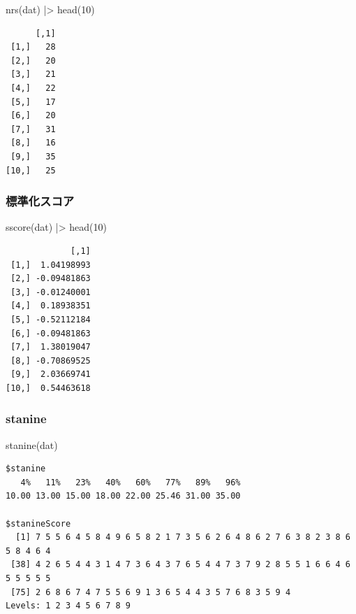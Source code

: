 \documentclass[
  a4paper,
]{ltjsbook}
\newenvironment{Shaded}{\begin{snugshade}}{\end{snugshade}}
\newcommand{\DecValTok}[1]{\textcolor[rgb]{0.68,0.00,0.00}{#1}}
\newcommand{\FunctionTok}[1]{\textcolor[rgb]{0.28,0.35,0.67}{#1}}
\newcommand{\NormalTok}[1]{\textcolor[rgb]{0.00,0.23,0.31}{#1}}
\newcommand{\SpecialCharTok}[1]{\textcolor[rgb]{0.37,0.37,0.37}{#1}}
\begin{document}
\begin{Shaded}
\begin{Highlighting}[]
\FunctionTok{nrs}\NormalTok{(dat) }\SpecialCharTok{|\textgreater{}} \FunctionTok{head}\NormalTok{(}\DecValTok{10}\NormalTok{)}
\end{Highlighting}
\end{Shaded}

\begin{verbatim}
      [,1]
 [1,]   28
 [2,]   20
 [3,]   21
 [4,]   22
 [5,]   17
 [6,]   20
 [7,]   31
 [8,]   16
 [9,]   35
[10,]   25
\end{verbatim}

\subsubsection{標準化スコア}\label{ux6a19ux6e96ux5316ux30b9ux30b3ux30a2}

\begin{Shaded}
\begin{Highlighting}[]
\FunctionTok{sscore}\NormalTok{(dat) }\SpecialCharTok{|\textgreater{}} \FunctionTok{head}\NormalTok{(}\DecValTok{10}\NormalTok{)}
\end{Highlighting}
\end{Shaded}

\begin{verbatim}
             [,1]
 [1,]  1.04198993
 [2,] -0.09481863
 [3,] -0.01240001
 [4,]  0.18938351
 [5,] -0.52112184
 [6,] -0.09481863
 [7,]  1.38019047
 [8,] -0.70869525
 [9,]  2.03669741
[10,]  0.54463618
\end{verbatim}

\subsubsection{stanine}\label{stanine}

\begin{Shaded}
\begin{Highlighting}[]
\FunctionTok{stanine}\NormalTok{(dat)}
\end{Highlighting}
\end{Shaded}

\begin{verbatim}
$stanine
   4%   11%   23%   40%   60%   77%   89%   96% 
10.00 13.00 15.00 18.00 22.00 25.46 31.00 35.00 

$stanineScore
  [1] 7 5 5 6 4 5 8 4 9 6 5 8 2 1 7 3 5 6 2 6 4 8 6 2 7 6 3 8 2 3 8 6 5 8 4 6 4
 [38] 4 2 6 5 4 4 3 1 4 7 3 6 4 3 7 6 5 4 4 7 3 7 9 2 8 5 5 1 6 6 4 6 5 5 5 5 5
 [75] 2 6 8 6 7 4 7 5 5 6 9 1 3 6 5 4 4 3 5 7 6 8 3 5 9 4
Levels: 1 2 3 4 5 6 7 8 9
\end{verbatim}
\end{document}
